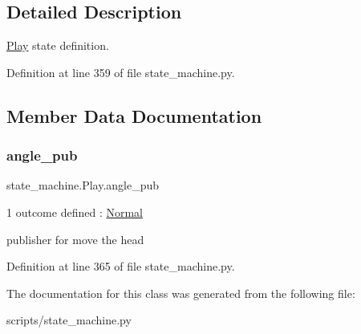 \subsection{Detailed Description}
\hyperlink{classstate__machine_1_1Play}{Play} state definition. 

Definition at line 359 of file state\+\_\+machine.\+py.



\subsection{Member Data Documentation}
\mbox{\label{classstate__machine_1_1Play_ad451724fb1afb5a066901dead8566553}} 
\subsubsection{\texorpdfstring{angle\+\_\+pub}{angle\_pub}}
{\footnotesize\ttfamily state\+\_\+machine.\+Play.\+angle\+\_\+pub}



1 outcome defined \+: \hyperlink{classstate__machine_1_1Normal}{Normal} 

publisher for move the head 

Definition at line 365 of file state\+\_\+machine.\+py.



The documentation for this class was generated from the following file\+:\begin{DoxyCompactItemize}
\item 
scripts/state\+\_\+machine.\+py\end{DoxyCompactItemize}
